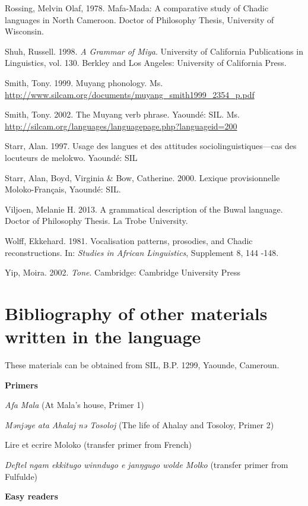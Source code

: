 Rossing, Melvin Olaf, 1978.  Mafa-Mada:  A comparative study of Chadic languages in North Cameroon.  Doctor of Philosophy Thesis, University of Wisconsin.  

Shuh, Russell.  1998.  \textit{A Grammar of Miya}.  University of California Publications in Linguistics, vol. 130.  Berkley and Los Angeles:  University of California Press.  

Smith, Tony. 1999. Muyang phonology. Ms. \url{http://www.silcam.org/documents/muyang_smith1999_2354_p.pdf} 

Smith, Tony.  2002.  The Muyang verb phrase. Yaoundé: SIL. Ms. \url{http://silcam.org/languages/languagepage.php?languageid=200} 

\begin{styleReferences}
Starr, Alan. 1997. Usage des langues et des attitudes sociolinguistiques—cas des locuteurs de melokwo. Yaoundé: SIL
\end{styleReferences}

Starr, Alan, Boyd, Virginia \& Bow, Catherine. 2000. Lexique provisionnelle Moloko-Français, Yaoundé:  SIL.

Viljoen, Melanie H. 2013. A grammatical description of the Buwal language. Doctor of Philosophy Thesis. La Trobe University.

Wolff, Ekkehard.  1981.  Vocalisation patterns, prosodies, and Chadic reconstructions. In: \textit{Studies in African Linguistics}, Supplement 8, 144 -148.

Yip, Moira. 2002. \textit{Tone}. Cambridge: Cambridge University Press

\section{Bibliography of other materials written in the language}
\hypertarget{RefHeading1213641525720847}{}
These materials can be obtained from SIL, B.P. 1299, Yaounde, Cameroun.

\textbf{Primers}

\textit{Afa Mala} (At Mala’s house, Primer 1)

\textit{Mənjəye ata Aha}\textit{laj}\textit{ nə Tosoloj} (The life of Ahalay and Tosoloy, Primer 2)

Lire et ecrire Moloko (transfer primer from French)

\textit{Deftel ngam ekkitugo winndugo e janŋgugo wolde Molko} (transfer primer from Fulfulde)

\textbf{Easy readers}


